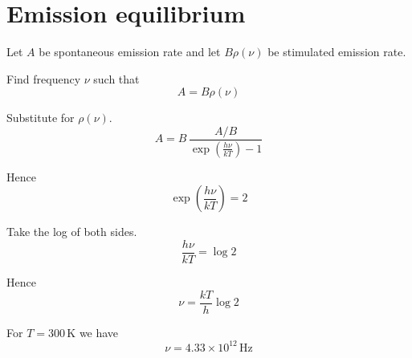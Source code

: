 

\section*{Emission equilibrium}

Let $A$ be spontaneous emission rate and let $B\rho(\nu)$ be stimulated emission rate.

\bigskip
Find frequency $\nu$ such that
\begin{equation*}
A=B\rho(\nu)
\end{equation*}

Substitute for $\rho(\nu)$.
\begin{equation*}
A=B\,\frac{A/B}{\exp\left(\frac{h\nu}{kT}\right)-1}
\end{equation*}

Hence
\begin{equation*}
\exp\left(\frac{h\nu}{kT}\right)=2
\end{equation*}

Take the log of both sides.
\begin{equation*}
\frac{h\nu}{kT}=\log2
\end{equation*}

Hence
\begin{equation*}
\nu=\frac{kT}{h}\log2
\end{equation*}

For $T=300\,\text{K}$ we have
\begin{equation*}
\nu=4.33\times10^{12}\,\text{Hz}
\end{equation*}


